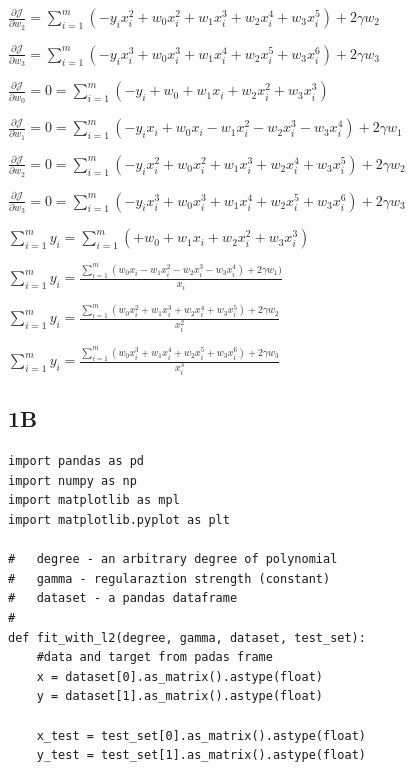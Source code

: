 \documentclass[12pt]{article}
\begin{document}
\begin{flushleft}
		$\frac{\partial \mathcal{J}}{\partial w_2} = \sum_{i=1}^{m} (- y_i x_i^2 + w_0 x_i^2 + w_1 x_i^3 + w_2 x_i^4 + w_3 x_i^5) + 2 \gamma w_2$
		
		$\frac{\partial \mathcal{J}}{\partial w_3} = \sum_{i=1}^{m} (- y_i x_i^3 + w_0 x_i^3 + w_1 x_i^4 + w_2 x_i^5 + w_3 x_i^6) + 2 \gamma w_3$
		
				\vspace{0.5cm}
		
		$\frac{\partial \mathcal{J}}{\partial w_0} = 0 =\sum_{i=1}^{m} (- y_i + w_0 + w_1 x_i + w_2 x_i^2 + w_3 x_i^3)$
		
		$\frac{\partial \mathcal{J}}{\partial w_1} = 0 =\sum_{i=1}^{m} (- y_i x_i + w_0 x_i - w_1 x_i^2 - w_2 x_i^3 - w_3 x_i^4) + 2 \gamma w_1$
		
		$\frac{\partial \mathcal{J}}{\partial w_2} = 0 =\sum_{i=1}^{m} (- y_i x_i^2 + w_0 x_i^2 + w_1 x_i^3 + w_2 x_i^4 + w_3 x_i^5) + 2 \gamma w_2$
		
		$\frac{\partial \mathcal{J}}{\partial w_3} = 0 =\sum_{i=1}^{m} (- y_i x_i^3 + w_0 x_i^3 + w_1 x_i^4 + w_2 x_i^5 + w_3 x_i^6) + 2 \gamma w_3$
		
		\vspace{0.5cm}
		
		$\sum_{i=1}^{m} y_i = \sum_{i=1}^{m} (+ w_0 + w_1 x_i + w_2 x_i^2 + w_3 x_i^3)$
		
		$\sum_{i=1}^{m} y_i = \frac{\sum_{i=1}^{m} (w_0 x_i - w_1 x_i^2 - w_2 x_i^3 - w_3 x_i^4) + 2 \gamma w_1)}{x_i}$
		
		$\sum_{i=1}^{m} y_i = \frac{\sum_{i=1}^{m} (w_0 x_i^2 + w_1 x_i^3 + w_2 x_i^4 + w_3 x_i^5) + 2 \gamma w_2}{x_i^2}$
		
		$\sum_{i=1}^{m} y_i = \frac{\sum_{i=1}^{m} ( w_0 x_i^3 + w_1 x_i^4 + w_2 x_i^5 + w_3 x_i^6) + 2 \gamma w_3}{x_i^3}$
		
		\subsection*{1B}
\begin{lstlisting}
import pandas as pd
import numpy as np
import matplotlib as mpl
import matplotlib.pyplot as plt

#	degree - an arbitrary degree of polynomial
#	gamma - regularaztion strength (constant)
#	dataset - a pandas dataframe
#
def fit_with_l2(degree, gamma, dataset, test_set):
	#data and target from padas frame
	x = dataset[0].as_matrix().astype(float)
	y = dataset[1].as_matrix().astype(float)
	
	x_test = test_set[0].as_matrix().astype(float)
	y_test = test_set[1].as_matrix().astype(float)
	

\end{lstlisting}
\end{flushleft}
\end{document}
